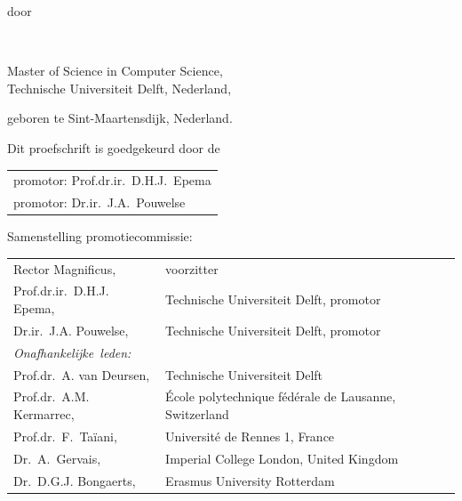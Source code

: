 \begin{titlepage}
\begin{center}
\bigskip
\bigskip

door

\bigskip
\bigskip

\makeatletter
{\Large\titlefont\bfseries\@firstname\ \titleshape{\MakeUppercase{\@lastname}}}
\makeatother

\bigskip
\bigskip

Master of Science in Computer Science, \\
Technische Universiteit Delft, Nederland,

geboren te Sint-Maartensdijk, Nederland.

\vspace*{2\bigskipamount}

\end{center}

\clearpage
\thispagestyle{empty}

\noindent Dit proefschrift is goedgekeurd door de

\medskip\noindent
\begin{tabular}{l}
    promotor: Prof.dr.ir.\ D.H.J.\ Epema \\
    promotor: Dr.ir.\ J.A.\ Pouwelse
\end{tabular}

\bigskip
\noindent Samenstelling promotiecommissie:

\medskip\noindent
\begin{tabular}{p{4.5cm}l}
    Rector Magnificus, & voorzitter \\
    Prof.dr.ir.\ D.H.J. Epema, & Technische Universiteit Delft, promotor\\
    Dr.ir.\ J.A. Pouwelse, & Technische Universiteit Delft, promotor\\

    \medskip
    \mbox{\emph{Onafhankelijke leden:}} & \\
    Prof.dr.\ A. van Deursen, & Technische Universiteit Delft \\
    Prof.dr.\ A.M. Kermarrec, & École polytechnique fédérale de Lausanne, Switzerland \\
    Prof.dr.\ F.\ Taïani, & Université de Rennes 1, France \\
    Dr.\ A.\ Gervais, & Imperial College London, United Kingdom \\
    Dr.\ D.G.J. Bongaerts, & Erasmus University Rotterdam \\
    

\end{tabular}
\end{titlepage}
